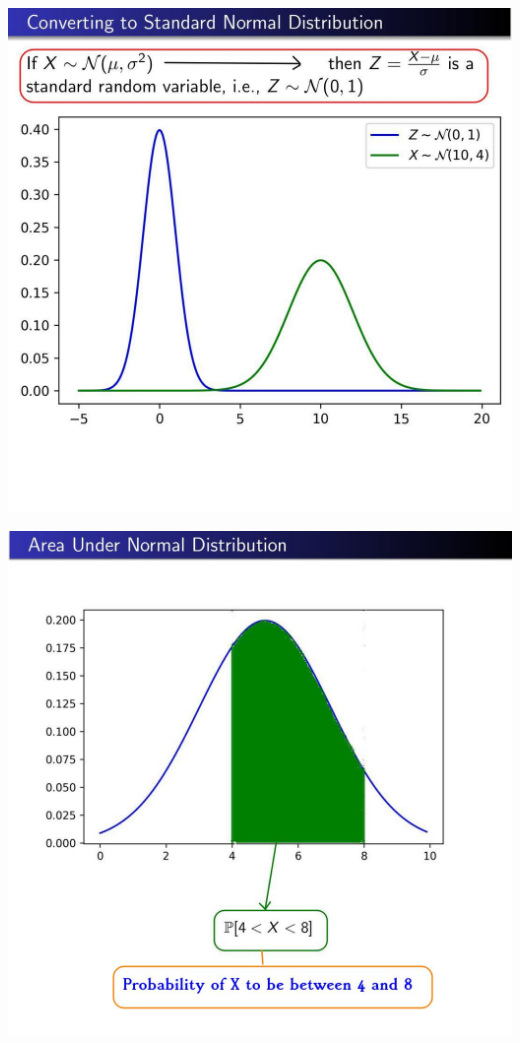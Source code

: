 \documentclass[12pt,aspectratio=169]{beamer}
\begin{document}
\begin{frame}
\begin{center}
\includegraphics[scale=0.7]{6}
\end{center}
\end{frame}

\begin{frame}
\begin{center}
\includegraphics[scale=0.3]{7}
\end{center}
\end{frame}
\end{document}
